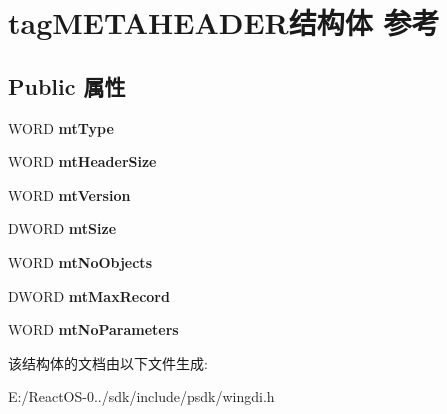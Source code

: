 \hypertarget{structtag_m_e_t_a_h_e_a_d_e_r}{}\section{tag\+M\+E\+T\+A\+H\+E\+A\+D\+E\+R结构体 参考}
\label{structtag_m_e_t_a_h_e_a_d_e_r}
\subsection*{Public 属性}
\begin{DoxyCompactItemize}
\item 
\mbox{\label{structtag_m_e_t_a_h_e_a_d_e_r_af2df4de38cbcd2bae97489cd6ca6a2ca}} 
W\+O\+RD {\bfseries mt\+Type}
\item 
\mbox{\label{structtag_m_e_t_a_h_e_a_d_e_r_a770b7255e942e386958230a6a415a77a}} 
W\+O\+RD {\bfseries mt\+Header\+Size}
\item 
\mbox{\label{structtag_m_e_t_a_h_e_a_d_e_r_ad044f6e0342aacddbb58f0b70dd2b945}} 
W\+O\+RD {\bfseries mt\+Version}
\item 
\mbox{\label{structtag_m_e_t_a_h_e_a_d_e_r_aa22e93d10eff23e07b594451af2cca15}} 
D\+W\+O\+RD {\bfseries mt\+Size}
\item 
\mbox{\label{structtag_m_e_t_a_h_e_a_d_e_r_aadfc27278bdbdcc1231effe76b2a75b4}} 
W\+O\+RD {\bfseries mt\+No\+Objects}
\item 
\mbox{\label{structtag_m_e_t_a_h_e_a_d_e_r_a96495c40b4f7aa8f671587f1384345a5}} 
D\+W\+O\+RD {\bfseries mt\+Max\+Record}
\item 
\mbox{\label{structtag_m_e_t_a_h_e_a_d_e_r_a47de539831727769f05eb10dd9ffbba9}} 
W\+O\+RD {\bfseries mt\+No\+Parameters}
\end{DoxyCompactItemize}


该结构体的文档由以下文件生成\+:\begin{DoxyCompactItemize}
\item 
E\+:/\+React\+O\+S-\/0../sdk/include/psdk/wingdi.\+h\end{DoxyCompactItemize}
